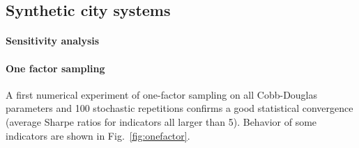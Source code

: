 \documentclass[11pt]{article}
\begin{document}
\subsection{Synthetic city systems}

\paragraph{Sensitivity analysis}


\paragraph{One factor sampling}

A first numerical experiment of one-factor sampling on all Cobb-Douglas parameters and 100 stochastic repetitions confirms a good statistical convergence (average Sharpe ratios for indicators all larger than 5). Behavior of some indicators are shown in Fig.~\ref{fig:onefactor}.
\end{document}
